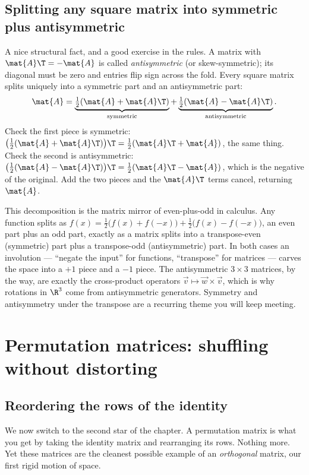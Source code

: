 \subsection{Splitting any square matrix into symmetric plus antisymmetric}

A nice structural fact, and a good exercise in the rules. A matrix with $\mat{A}\T=-\mat{A}$ is called
\emph{antisymmetric} (or skew-symmetric); its diagonal must be zero and entries flip sign across the
fold. Every square matrix splits uniquely into a symmetric part and an antisymmetric part:
\[
  \mat{A}
  = \underbrace{\tfrac12(\mat{A}+\mat{A}\T)}_{\text{symmetric}}
  + \underbrace{\tfrac12(\mat{A}-\mat{A}\T)}_{\text{antisymmetric}}.
\]
Check the first piece is symmetric: $\big(\tfrac12(\mat{A}+\mat{A}\T)\big)\T
=\tfrac12(\mat{A}\T+\mat{A})$, the same thing. Check the second is antisymmetric:
$\big(\tfrac12(\mat{A}-\mat{A}\T)\big)\T=\tfrac12(\mat{A}\T-\mat{A})$, which is the negative of the
original. Add the two pieces and the $\mat{A}\T$ terms cancel, returning $\mat{A}$.

\begin{connectionbox}
This decomposition is the matrix mirror of even-plus-odd in calculus. Any function splits as
$f(x)=\tfrac12\big(f(x)+f(-x)\big)+\tfrac12\big(f(x)-f(-x)\big)$, an even part plus an odd part,
exactly as a matrix splits into a transpose-even (symmetric) part plus a transpose-odd
(antisymmetric) part. In both cases an involution --- ``negate the input'' for functions, ``transpose''
for matrices --- carves the space into a $+1$ piece and a $-1$ piece. The antisymmetric $3\times 3$
matrices, by the way, are exactly the cross-product operators $\vec{v}\mapsto \vec{w}\times\vec{v}$,
which is why rotations in $\R^3$ come from antisymmetric generators. Symmetry and antisymmetry under
the transpose are a recurring theme you will keep meeting.
\end{connectionbox}

\section{Permutation matrices: shuffling without distorting}

\subsection{Reordering the rows of the identity}

We now switch to the second star of the chapter. A permutation matrix is what you get by taking the
identity matrix and rearranging its rows. Nothing more. Yet these matrices are the cleanest possible
example of an \emph{orthogonal} matrix, our first rigid motion of space.

